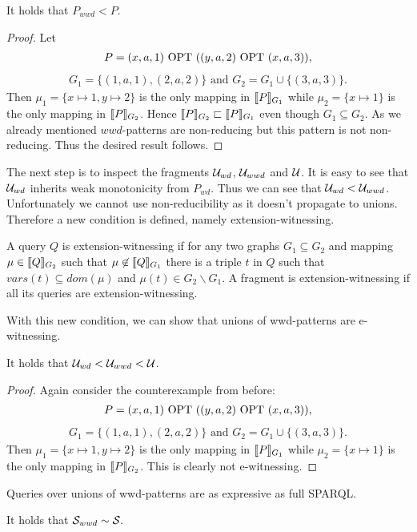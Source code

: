 \begin{theorem}
	It holds that $P_{wwd} < P$.
\end{theorem}
\begin{proof}
	Let 
	\begin{align*}
		P = (x, a, 1) \mbox{ OPT } ((y,a,2) \mbox{ OPT }(x,a,3)),
	\end{align*}
	\begin{align*}
		G_1 = \{(1,a,1),(2,a,2)\} \mbox{ and } G_2 = G_1 \cup \{(3,a,3)\}.
	\end{align*}
	Then $\mu_1 = \{x \mapsto 1, y \mapsto 2\}$ is the only mapping in $\llbracket
	P\rrbracket_{G_1}$ while $\mu_2 = \{x \mapsto 1\}$ is the only mapping in $\llbracket P
	\rrbracket_{G_2}$. Hence $\llbracket P \rrbracket_{G_2} \sqsubset \llbracket P \rrbracket_{G_1}$ even though
	$G_1 \subseteq G_2$. As we already mentioned $wwd$-patterns are non-reducing
	but this pattern is not non-reducing. Thus the desired result follows.
\end{proof}

The next step is to inspect the fragments $\mathcal{U}_{wd}$, $\mathcal{U}_{wwd}$ and $\mathcal{U}$.
It is easy to see that $\mathcal{U}_{wd}$ inherits weak monotonicity from
$P_{wd}$. Thus we can see that $\mathcal{U}_{wd} < \mathcal{U}_{wwd}$.
Unfortunately we cannot use non-reducibility as it doesn't propagate to unions.
Therefore a new condition is defined, namely extension-witnessing.

\begin{definition}
	A query $Q$ is extension-witnessing if for any two graphs $G_1 \subseteq
	G_2$ and mapping $\mu \in \llbracket Q \rrbracket_{G_2}$ such that $\mu \not \in \llbracket Q
	\rrbracket_{G_1}$ there is a triple $t$ in $Q$ such that $vars(t) \subseteq
	dom(\mu)$ and $\mu(t) \in G_2 \backslash G_1$. A fragment is
	extension-witnessing if all its queries are extension-witnessing.
\end{definition}

With this new condition, we can show that unions of wwd-patterns are
e-witnessing. 

\begin{theorem}
	It holds that $\mathcal{U}_{wd} < \mathcal{U}_{wwd} < \mathcal{U}$.
\end{theorem}
\begin{proof}
	Again consider the counterexample from before:	
	\begin{align*}
		P = (x, a, 1) \mbox{ OPT } ((y,a,2) \mbox{ OPT }(x,a,3)),
	\end{align*}
	\begin{align*}
		G_1 = \{(1,a,1),(2,a,2)\} \mbox{ and } G_2 = G_1 \cup \{(3,a,3)\}.
	\end{align*}
	Then $\mu_1 = \{x \mapsto 1, y \mapsto 2\}$ is the only mapping in $\llbracket
	P\rrbracket_{G_1}$ while $\mu_2 = \{x \mapsto 1\}$ is the only mapping in $\llbracket P
	\rrbracket_{G_2}$.
	This is clearly not e-witnessing.
\end{proof}
Queries over unions of wwd-patterns are as expressive as full SPARQL.
\begin{theorem}
	It holds that $\mathcal{S}_{wwd} \sim \mathcal{S}.$
\end{theorem}

